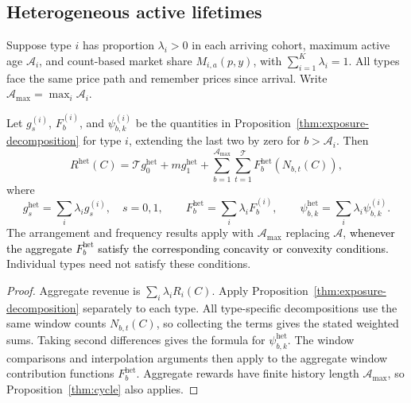 \par\endgroup

\subsection{Heterogeneous active lifetimes}
Suppose type \(i\) has proportion \(\lambda_i>0\) in each arriving cohort, maximum active age \(\mathcal A_i\), and count-based market share \(M_{i,a}(p,y)\), with \(\sum_{i=1}^K\lambda_i=1\). All types face the same price path and remember prices since arrival. Write \(\mathcal A_{\max}=\max_i\mathcal A_i\).
\begin{proposition}
\label{prop:general-heterogeneous-horizons}
Let \(g_s^{(i)}\), \(F_b^{(i)}\), and \(\psi_{b,k}^{(i)}\) be the quantities in Proposition~\ref{thm:exposure-decomposition} for type \(i\), extending the last two by zero for \(b>\mathcal A_i\). Then
\[
 R^{\mathrm{het}}(C)=\mathcal T g_0^{\mathrm{het}}+mg_1^{\mathrm{het}}
 +\sum_{b=1}^{\mathcal A_{\max}}\sum_{t=1}^{\mathcal T}
 F_b^{\mathrm{het}}(N_{b,t}(C)),
\]
where
\[
 g_s^{\mathrm{het}}=\sum_i\lambda_i g_s^{(i)},\quad s=0,1,
 \qquad F_b^{\mathrm{het}}=\sum_i\lambda_iF_b^{(i)},\qquad
 \psi_{b,k}^{\mathrm{het}}=\sum_i\lambda_i\psi_{b,k}^{(i)}.
\]
The arrangement and frequency results apply with \(\mathcal A_{\max}\) replacing \(\mathcal A\), \textcolor{black}{whenever the aggregate \(F_b^{\mathrm{het}}\) satisfy the corresponding concavity or convexity conditions.} Individual types need not satisfy these conditions.
\end{proposition}
\begin{proof}
Aggregate revenue is \(\sum_i\lambda_iR_i(C)\). Apply Proposition~\ref{thm:exposure-decomposition} separately to each type. All type-specific decompositions use the same window counts \(N_{b,t}(C)\), so collecting the terms gives the stated weighted sums. Taking second differences gives the formula for \(\psi_{b,k}^{\mathrm{het}}\). The window comparisons and interpolation arguments then apply to the aggregate window contribution functions \(F_b^{\mathrm{het}}\). Aggregate rewards have finite history length \(\mathcal A_{\max}\), so Proposition~\ref{thm:cycle} also applies.
\end{proof}
